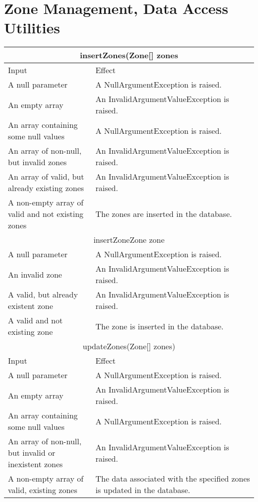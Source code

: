 \documentclass[11pt,oneside,a4paper]{report}
\begin{document}
\section{Zone Management, Data Access Utilities}
\begin{tabular}{p{5cm}|p{6cm}}
	\hline
	\multicolumn{2}{c}{insertZones(Zone[] zones}\\\hline
	Input & Effect \\\hline
	A null parameter &
	A NullArgumentException is raised.\\\hline
	An empty array &
	An InvalidArgumentValueException is raised.\\\hline
	An array containing some null values &
	A NullArgumentException is raised.\\\hline
	An array of non-null, but invalid zones &
	An InvalidArgumentValueException  is raised. \\\hline
	An array of valid, but already existing zones &
	An InvalidArgumentValueException  is raised. \\\hline
	A non-empty array of valid and not existing zones &
	The zones are inserted in the database. \ \\\hline\hline
	
	\multicolumn{2}{c}{insertZone{Zone zone}}\\\hline
	A null parameter &
	A NullArgumentException is raised.\\\hline
	An invalid zone &
	An InvalidArgumentValueException  is raised. \\\hline
	A valid, but already existent zone &
	An InvalidArgumentValueException  is raised. \\\hline
	A valid and not existing zone &
	The zone is inserted in the database. \ \\\hline\hline
	
	\multicolumn{2}{c}{updateZones(Zone[] zones)}\\\hline
	Input & Effect \\\hline
	A null parameter &
	A NullArgumentException is raised.\\\hline
	An empty array &
	An InvalidArgumentValueException is raised.\\\hline
	An array containing some null values &
	A NullArgumentException is raised.\\\hline
	An array of non-null, but invalid or inexistent zones &
	An InvalidArgumentValueException  is raised. \\\hline
	A non-empty array of valid, existing zones &
	The data associated with the specified zones is updated in the database. \\\hline\hline
	

\end{tabular}
\end{document}
